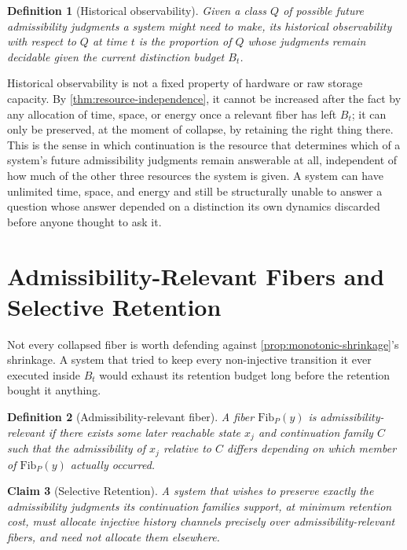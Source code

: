 \documentclass[12pt]{report}
\newtheorem{definition}{Definition}[section]
\newtheorem{claim}[definition]{Claim}
\begin{document}
\begin{definition}[Historical observability]
\label{def:historical-observability}
Given a class $Q$ of possible future admissibility judgments a system
might need to make, its historical observability with respect to $Q$ at
time $t$ is the proportion of $Q$ whose judgments remain decidable given
the current distinction budget $B_t$.
\end{definition}

Historical observability is not a fixed property of hardware or raw
storage capacity. By \cref{thm:resource-independence}, it cannot be
increased after the fact by any allocation of time, space, or energy once
a relevant fiber has left $B_t$; it can only be preserved, at the moment
of collapse, by retaining the right thing there. This is the sense in
which continuation is the resource that determines which of a system's
future admissibility judgments remain answerable at all, independent of
how much of the other three resources the system is given. A system can
have unlimited time, space, and energy and still be structurally unable
to answer a question whose answer depended on a distinction its own
dynamics discarded before anyone thought to ask it.

\section{Admissibility-Relevant Fibers and Selective Retention}
\label{sec:selective-retention}

Not every collapsed fiber is worth defending against
\cref{prop:monotonic-shrinkage}'s shrinkage. A system that tried to keep
every non-injective transition it ever executed inside $B_t$ would
exhaust its retention budget long before the retention bought it
anything.

\begin{definition}[Admissibility-relevant fiber]
\label{def:admissibility-relevant}
A fiber $\mathrm{Fib}_P(y)$ is admissibility-relevant if there exists
some later reachable state $x_j$ and continuation family $C$ such that
the admissibility of $x_j$ relative to $C$ differs depending on which
member of $\mathrm{Fib}_P(y)$ actually occurred.
\end{definition}

\begin{claim}[Selective Retention]
\label{thm:selective-retention}
A system that wishes to preserve exactly the admissibility judgments its
continuation families support, at minimum retention cost, must allocate
injective history channels precisely over admissibility-relevant fibers,
and need not allocate them elsewhere.
\end{claim}
\end{document}
